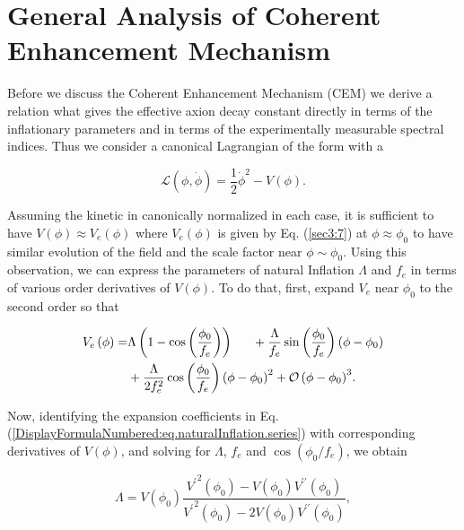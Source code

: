 \documentclass[12pt]{article}
\begin{document}
\section{General Analysis of Coherent Enhancement Mechanism \label{sec:CoherentEnhancement}}
Before we discuss the Coherent Enhancement Mechanism (CEM) we derive a relation what gives the effective axion decay constant directly
in terms of the inflationary parameters and in terms of the experimentally measurable spectral indices.
Thus we consider a canonical Lagrangian of the form with a

\begin{equation}
  \mathcal{L}\left(\phi,\dot{\phi}\right)=\frac{1}{2}{\dot{\phi}}^2-V\left(\phi \right).
\end{equation}

Assuming the kinetic in canonically normalized in each case, it is sufficient to have $V\left(\phi \right)\approx V_{e}\left(\phi \right)$
where $V_{e}\left(\phi \right)$ is given by Eq. (\ref{sec3:7})
at $\phi \approx \phi_0$ to have similar evolution of the field and the scale factor near $\phi\sim \phi_0$. Using this observation, we can express the parameters of natural Inflation $\Lambda$ and $f_e$ in terms of various order derivatives of $V\left(\phi \right)$. To do that, first, expand $V_{e}$ near $\phi_0$ to the second order so that

\begin{equation}\label{DisplayFormulaNumbered:eq.naturalInflation.series}
  \begin{split}
    V_{e}\left(\phi \right)=&\Lambda \left(1-\cos\left(\frac{\phi_0}{f_e}\right)\right)
    \indent{}+\frac{\Lambda}{f_e}\sin\left(\frac{\phi_0}{f_e}\right)\left(\phi -\phi_0\right)\\
    &+\frac{\Lambda}{2f_e^2}\cos\left(\frac{\phi_0}{f_e}\right){\left(\phi -\phi_0\right)}^2+{\mathcal{O}\left(\phi -\phi_0\right)}^3.
  \end{split}
\end{equation}

Now, identifying the expansion coefficients in Eq.(\ref{DisplayFormulaNumbered:eq.naturalInflation.series}) with corresponding derivatives of $V\left(\phi \right)$, and solving for $\Lambda$, $f_e$ and $\cos\left(\phi_0/f_e\right)$, we obtain

\begin{equation}\label{DisplayFormulaNumbered:eq.lambda.potential}
  \Lambda =V\left(\phi_0\right)\frac{{V^\prime}^2\left(\phi_0\right)-V\left(\phi_0\right)V^{\prime\prime} \left(\phi_0\right)}{{V^\prime}^2\left(\phi_0\right)-2V\left(\phi_0\right)V^{\prime\prime} \left(\phi_0\right)},
\end{equation}
\end{document}
